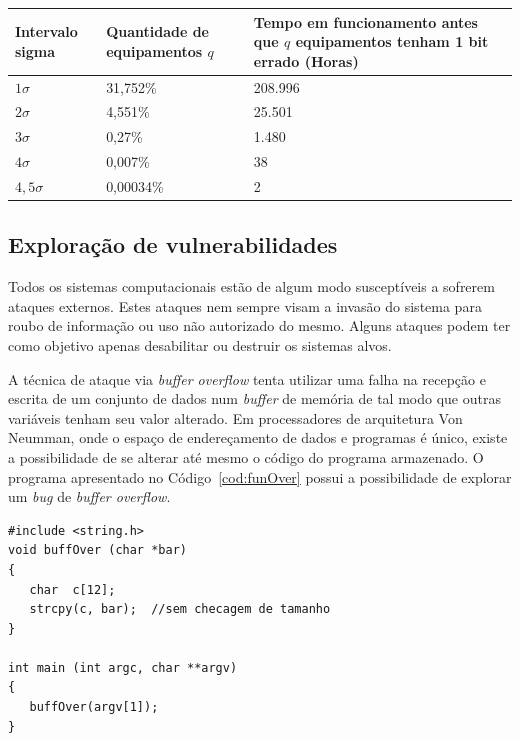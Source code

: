 \documentclass[12pt,openright,oneside,a4paper,brazil]{abntex2}
\begin{document}
\begin{table}[htbp]
	\begin{center}
	\label{tab:taxasFalhaSigma}
\begin{tabular}{|C{2cm}|C{4cm}|C{8cm}|}
\hline
Intervalo sigma & Quantidade de equipamentos $q$ & Tempo em funcionamento antes que $q$ equipamentos tenham 1 bit errado (Horas)\\ \hline
$1 \sigma$ & 31,752\% & 208.996\\ \hline
$2 \sigma$ & 4,551\% & 25.501\\ \hline
$3 \sigma$ & 0,27\% & 1.480\\ \hline
$4 \sigma$ & 0,007\% & 38\\ \hline
$4,5 \sigma$ & 0,00034\% & 2\\ \hline
\end{tabular} 
	\end{center}
\end{table}


\subsection{Exploração de vulnerabilidades}
Todos os sistemas computacionais estão de algum modo susceptíveis a sofrerem ataques externos. Estes ataques nem sempre visam a invasão do sistema para roubo de informação ou uso não autorizado do mesmo. Alguns ataques podem ter como objetivo apenas desabilitar ou destruir os sistemas alvos.

A técnica de ataque via \textit{buffer overflow} tenta utilizar uma falha na recepção e escrita de um conjunto de dados num \textit{buffer} de memória de tal modo que outras variáveis tenham seu valor alterado. Em processadores de arquitetura Von Neumman, onde o espaço de endereçamento de dados e programas é único, existe a possibilidade de se alterar até mesmo o código do programa armazenado. O programa apresentado no Código~\ref{cod:funOver} possui a possibilidade de explorar um \textit{bug} de \textit{buffer overflow}\cite{wiki2013buffer}.

\begin{lstlisting}[float,caption=Exemplo de função com vulnerabilidade de \textit{buffer overflow},label=cod:funOver]
#include <string.h>
void buffOver (char *bar)
{
   char  c[12];
   strcpy(c, bar);  //sem checagem de tamanho
}
 
int main (int argc, char **argv)
{
   buffOver(argv[1]); 
}
\end{lstlisting}
 
\end{document}
